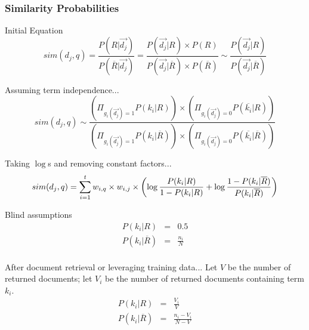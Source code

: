 \documentclass[svgnames]{beamer}
\begin{document}
\begin{frame}[allowframebreaks]
  \frametitle{Similarity Probabilities}

  \begin{block}{Initial Equation}
    \begin{displaymath}
        sim(d_j,q) = \frac{P(R|\vec{d_j})}{P(\overline{R}|\vec{d_j})}
        = \frac{P(\vec{d_j}|R) \times P(R)}{P(\vec{d_j}|\overline{R}) \times
          P(\overline{R})}
        \sim \frac{P(\vec{d_j}|R)}{P(\vec{d_j}|\overline{R})}
     \end{displaymath}
  \end{block}

  \begin{block}{Assuming term independence...}
    \begin{displaymath}
      sim(d_j,q) \sim \frac{
        (\Pi_{g_i(\vec{d_j})=1}P(k_i|R))\times(\Pi_{g_i(\vec{d_j})=0}P(\overline{k_i}|R))
      }{
        (\Pi_{g_i(\vec{d_j})=1}P(k_i|\overline{R}))\times(\Pi_{g_i(\vec{d_j})=0}P(\overline{k_i}|\overline{R}))}
    \end{displaymath}
  \end{block}

  \begin{block}{Taking $\log$s and removing constant factors...}
    \begin{displaymath}
      \scriptsize
      sim(d_j,q) = \sum_{i=1}^t w_{i,q} \times w_{i,j} \times
      \left(
        \log\frac{P(k_i|R)}{1-P(k_i|R)} + \log\frac{1-P(k_i|\overline{R})}{P(k_i|\overline{R})}
      \right)
    \end{displaymath}
  \end{block}

  \begin{block}{Blind assumptions}
    \begin{displaymath}
      \begin{array}{rcl}
        P(k_i|R) &=& 0.5\\
        P(k_i|\overline{R}) &=& \frac{n_i}{N}\\
      \end{array}
    \end{displaymath}
  \end{block}

  \begin{block}{After document retrieval or leveraging training data...}
    Let $V$ be the number of returned documents; let $V_i$ be the number of
    returned documents containing term $k_i$.
    \begin{displaymath}
      \begin{array}{rcl}
        P(k_i|R) &=& \frac{V_i}{V}\\
        P(k_i|\overline{R}) &=& \frac{n_i - V_i}{N - V}\\
      \end{array}
    \end{displaymath}    
  \end{block}
  

\end{frame}
\end{document}
